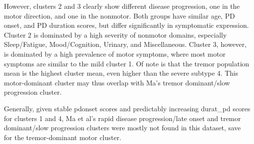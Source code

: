 \documentclass[preprint,5p]{elsarticle} %
\begin{document}
However, clusters 2 and 3 clearly show different disease progression, one in
the motor direction, and one in the nonmotor. Both groups have similar age,
PD onset, and PD duration scores, but differ significantly in symptomatic expression.
Cluster 2 is dominated by a high severity of nonmotor domains, especially Sleep/Fatigue,
Mood/Cognition, Urinary, and Miscellaneous.  Cluster 3, however, is dominated by a high prevalence
of motor symptoms, where most motor symptoms are similar to the mild cluster 1. Of note is that the
tremor population mean is the highest cluster mean, even higher than the severe subtype 4. This
motor-dominant cluster may thus overlap with Ma's tremor dominant/slow progression
cluster\cite{ma15}.

Generally, given stable pdonset scores and predictably increasing durat\_pd
scores for clusters 1 and 4, Ma et al's rapid disease
progression/late onset and tremor dominant/slow progression clusters
\cite{ma15} were mostly not found in this dataset, save for the tremor-dominant
motor cluster.



\end{document}
